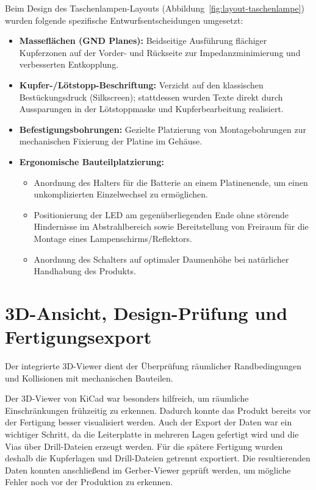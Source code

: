 Beim Design des Taschenlampen-Layouts (Abbildung~\ref{fig:layout-taschenlampe}) wurden folgende spezifische Entwurfsentscheidungen umgesetzt:
\begin{itemize}
    \item \textbf{Masseflächen (GND Planes):} Beidseitige Ausführung flächiger Kupferzonen auf der Vorder- und Rückseite zur Impedanzminimierung und verbesserten Entkopplung.
    \item \textbf{Kupfer-/Lötstopp-Beschriftung:} Verzicht auf den klassischen Bestückungsdruck (Silkscreen); stattdessen wurden Texte direkt durch Aussparungen in der Lötstoppmaske und Kupferbearbeitung realisiert.
    \item \textbf{Befestigungsbohrungen:} Gezielte Platzierung von Montagebohrungen zur mechanischen Fixierung der Platine im Gehäuse.
    \item \textbf{Ergonomische Bauteilplatzierung:} 
    \begin{itemize}
        \item Anordnung des Halters für die Batterie an einem Platinenende, um einen unkomplizierten Einzelwechsel zu ermöglichen.
        \item Positionierung der LED am gegenüberliegenden Ende ohne störende Hindernisse im Abstrahlbereich sowie Bereitstellung von Freiraum für die Montage eines Lampenschirms/Reflektors.
        \item Anordnung des Schalters auf optimaler Daumenhöhe bei natürlicher Handhabung des Produkts.
   \end{itemize}
\end{itemize}
\section{3D-Ansicht, Design-Prüfung und Fertigungsexport}
Der integrierte 3D-Viewer dient der Überprüfung räumlicher Randbedingungen und Kollisionen mit mechanischen Bauteilen.

Der 3D-Viewer von KiCad war besonders hilfreich, um räumliche Einschränkungen frühzeitig zu erkennen. Dadurch konnte das Produkt bereits vor der Fertigung besser visualisiert werden. Auch der Export der Daten war ein wichtiger Schritt, da die Leiterplatte in mehreren Lagen gefertigt wird und die Vias über Drill-Dateien erzeugt werden. Für die spätere Fertigung wurden deshalb die Kupferlagen und Drill-Dateien getrennt exportiert. Die resultierenden Daten konnten anschließend im Gerber-Viewer geprüft werden, um mögliche Fehler noch vor der Produktion zu erkennen. 

